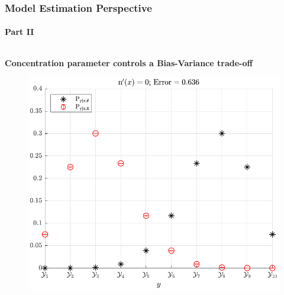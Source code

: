 \documentclass[aspectratio=169,usenames,dvipsnames]{beamer}
\begin{document}
\begin{frame}
\frametitle{Model Estimation Perspective}
\framesubtitle{Part II}

\begin{columns}[c]

\begin{column}{0.3\linewidth}

\textbf{Concentration parameter controls a Bias-Variance trade-off}

\vspace{1em}
\begin{figure}
\centering
\includegraphics[width=1\linewidth]{P_yx_error_N_0.pdf}
\end{figure}


\end{column}


\end{columns}
\end{frame}
\end{document}
